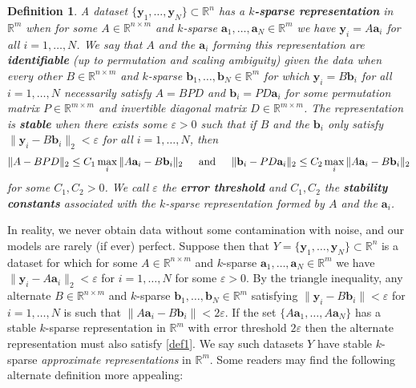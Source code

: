 \documentclass[journal, onecolumn]{IEEEtran}
\newtheorem{definition}{Definition}
\begin{document}
\begin{definition}\label{Uniqueness}
A dataset $\{\mathbf{y}_1, \ldots, \mathbf{y}_N\} \subset \mathbb{R}^n$ has a \textbf{$k$-sparse representation} in $\mathbb{R}^m$ when for some $A \in \mathbb{R}^{n \times m}$ and $k$-sparse $\mathbf{a}_1, \ldots, \mathbf{a}_N \in \mathbb{R}^m$ we have $\mathbf{y}_i = A\mathbf{a}_i$ for all $i = 1, \ldots, N$. We say that $A$ and the $\mathbf{a}_i$ forming this representation are \textbf{identifiable} (up to permutation and scaling ambiguity) given the data when every other $B \in \mathbb{R}^{n \times m}$ and $k$-sparse $\mathbf{b}_1, \ldots, \mathbf{b}_N \in \mathbb{R}^m$ for which $\mathbf{y}_i = B\mathbf{b}_i$ for all $i = 1, \ldots, N$ necessarily satisfy $A = BPD$ and $\mathbf{b}_i = PD\mathbf{a}_i$ for some permutation matrix $P \in \mathbb{R}^{m \times m}$ and invertible diagonal matrix $D \in \mathbb{R}^{m \times m}$. The representation is \textbf{stable} when there exists some $\varepsilon > 0$ such that if $B$ and the $\mathbf{b}_i$ only satisfy $\|\mathbf{y}_i - B\mathbf{b}_i\|_2 < \varepsilon$ for all $i = 1, \ldots, N$, then
\begin{align}\label{def1}
\|A - BPD\|_2 \leq C_1 \max_i \|A\mathbf{a}_i - B\mathbf{b}_i\|_2 
\indent \text{and} \indent
\|\mathbf{b}_i - PD\mathbf{a}_i\|_2 \leq C_2 \max_i \|A\mathbf{a}_i - B\mathbf{b}_i\|_2
\end{align}
for some $C_1, C_2>0$. We call $\varepsilon$ the \textbf{error threshold} and $C_1, C_2$ the \textbf{stability constants} associated with the $k$-sparse representation formed by $A$ and the $\mathbf{a}_i$.
\end{definition}

In reality, we never obtain data without some contamination with noise, and our models are rarely (if ever) perfect. Suppose then that $Y = \{\mathbf{y}_1, \ldots, \mathbf{y}_N\} \subset \mathbb{R}^n$ is a dataset for which for some $A \in \mathbb{R}^{n \times m}$ and $k$-sparse $\mathbf{a}_1, \ldots, \mathbf{a}_N \in \mathbb{R}^m$ we have $\|\mathbf{y}_i - A\mathbf{a}_i\|_2 < \varepsilon$ for $i = 1, \ldots, N$ for some $\varepsilon > 0$. By the triangle inequality, any alternate $B \in \mathbb{R}^{n \times m}$ and $k$-sparse $\mathbf{b}_1, \ldots, \mathbf{b}_N \in \mathbb{R}^m$ satisfying $\|\mathbf{y}_i - B\mathbf{b}_i\| < \varepsilon$ for $i = 1, \ldots, N$ is such that $\|A\mathbf{a}_i - B\mathbf{b}_i\| < 2\varepsilon$. If the set $\{A\mathbf{a}_1, \ldots, A\mathbf{a}_N\}$ has a stable $k$-sparse representation in $\mathbb{R}^m$ with error threshold $2\varepsilon$ then the alternate representation must also satisfy \eqref{def1}. We say such datasets $Y$ have stable $k$-sparse \emph{approximate representations} in $\mathbb{R}^m$. Some readers may find the following alternate definition more appealing:
\end{document}
